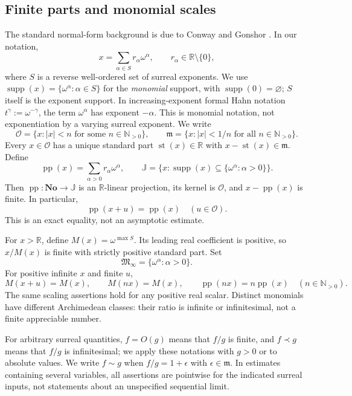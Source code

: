 \documentclass[11pt,letterpaper]{article}
\numberwithin{equation}{section}
\theoremstyle{plain}
\theoremstyle{definition}
\theoremstyle{remark}
\newcommand{\No}{\mathbf{No}}
\newcommand{\R}{\mathbb R}
\newcommand{\N}{\mathbb N}
\newcommand{\Ocal}{\mathcal O}
\newcommand{\mi}{\mathfrak m}
\newcommand{\J}{\mathbb J}
\newcommand{\Minf}{\mathfrak M_{\infty}}
\newcommand{\pp}{\operatorname{pp}}
\newcommand{\st}{\operatorname{st}}
\newcommand{\supp}{\operatorname{supp}}
\newcommand{\abs}[1]{\lvert#1\rvert}
\begin{document}
\subsection{Finite parts and monomial scales}
The standard normal-form background is due to Conway and Gonshor
\cite{Conway,Gonshor}. In our notation,
\begin{equation}\label{eq:normal-form}
 x=\sum_{\alpha\in S}r_\alpha\omega^\alpha,
 \qquad r_\alpha\in\R\setminus\{0\},
\end{equation}
where $S$ is a reverse well-ordered set of surreal exponents. We use
$\supp(x)=\{\omega^\alpha:\alpha\in S\}$ for the \emph{monomial}
support, with $\supp(0)=\varnothing$; $S$ itself is the exponent support.
In increasing-exponent formal Hahn notation $t^\gamma:=\omega^{-\gamma}$,
the term $\omega^\alpha$ has exponent $-\alpha$. This is monomial notation,
not exponentiation by a varying surreal exponent. We write
\[
 \Ocal=\{x:\abs{x}<n\text{ for some }n\in\N_{>0}\},\qquad
 \mi=\{x:\abs{x}<1/n\text{ for all }n\in\N_{>0}\}.
\]
Every $x\in\Ocal$ has a unique standard part $\st(x)\in\R$ with
$x-\st(x)\in\mi$. Define
\[
 \pp(x)=\sum_{\alpha>0}r_\alpha\omega^\alpha,
 \qquad \J=\{x:\supp(x)\subseteq\{\omega^\alpha:\alpha>0\}\}.
\]
Then $\pp:\No\to\J$ is an $\R$-linear projection, its kernel is
$\Ocal$, and $x-\pp(x)$ is finite. In particular,
\begin{equation}\label{eq:pp-translation}
 \pp(x+u)=\pp(x)\quad(u\in\Ocal).
\end{equation}
This is an exact equality, not an asymptotic estimate.

For $x>\R$, define $M(x)=\omega^{\max S}$. Its leading real coefficient is
positive, so $x/M(x)$ is finite with strictly positive standard part. Set
\[
 \Minf=\{\omega^\alpha:\alpha>0\}.
\]
For positive infinite $x$ and finite $u$,
\begin{equation}\label{eq:monomial-rules}
 M(x+u)=M(x),\qquad M(nx)=M(x),\qquad \pp(nx)=n\pp(x)
 \quad(n\in\N_{>0}).
\end{equation}
The same scaling assertions hold for any positive real scalar. Distinct
monomials have different Archimedean classes: their ratio is infinite or
infinitesimal, not a finite appreciable number.

For arbitrary surreal quantities, $f=O(g)$ means that $f/g$ is finite, and
$f\prec g$ means that $f/g$ is infinitesimal; we apply these notations with
$g>0$ or to absolute values. We write $f\sim g$ when $f/g=1+\epsilon$ with
$\epsilon\in\mi$. In estimates containing several variables, all assertions
are pointwise for the indicated surreal inputs, not statements about an
unspecified sequential limit.
\end{document}
